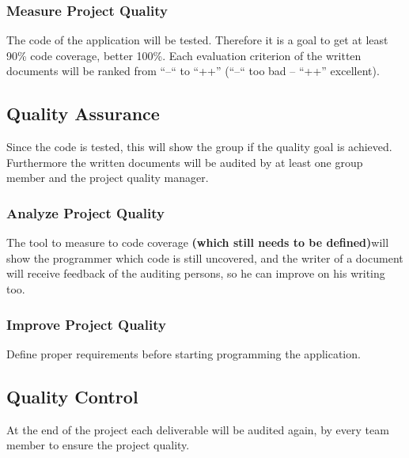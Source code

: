 \subsubsection{Measure Project Quality}
The code of the application will be tested. Therefore it is a goal to get at least 90\% code coverage, better 100\%. Each evaluation criterion of the written documents will be ranked from “--“ to “++” (“--“ too bad – “++” excellent).
\subsection{Quality Assurance}
Since the code is tested, this will show the group if the quality goal is achieved. Furthermore the written documents will be audited by at least one group member and the project quality manager.
\subsubsection{Analyze Project Quality}
The tool to measure to code coverage \textbf{(which still needs to be defined)}will show the programmer which code is still uncovered, and the writer of a document will receive feedback of the auditing persons, so he can improve on his writing too.
\subsubsection{Improve Project Quality}
Define proper requirements before starting programming the application.
\subsection{Quality Control}
At the end of the project each deliverable will be audited again, by every team member to ensure the project quality.
